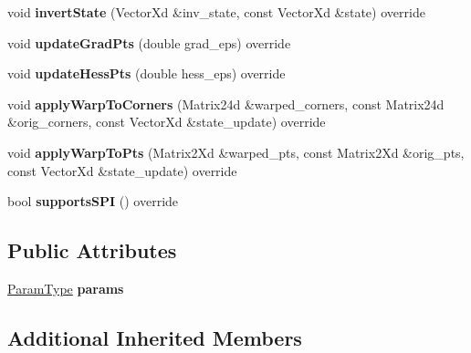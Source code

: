 \begin{DoxyCompactItemize}
\item 
\hypertarget{classIsometry_a7658e88cc1e74e64661b4db66d07be65}{void {\bfseries invert\-State} (Vector\-Xd \&inv\-\_\-state, const Vector\-Xd \&state) override}\label{classIsometry_a7658e88cc1e74e64661b4db66d07be65}

\item 
\hypertarget{classIsometry_af95c9c6d8ff1f16dad79428f77138753}{void {\bfseries update\-Grad\-Pts} (double grad\-\_\-eps) override}\label{classIsometry_af95c9c6d8ff1f16dad79428f77138753}

\item 
\hypertarget{classIsometry_a7dfb58a9b488913e6c4fd58c9b3803e2}{void {\bfseries update\-Hess\-Pts} (double hess\-\_\-eps) override}\label{classIsometry_a7dfb58a9b488913e6c4fd58c9b3803e2}

\item 
\hypertarget{classIsometry_afd4ab065934a567de9dc58be8e247c42}{void {\bfseries apply\-Warp\-To\-Corners} (Matrix24d \&warped\-\_\-corners, const Matrix24d \&orig\-\_\-corners, const Vector\-Xd \&state\-\_\-update) override}\label{classIsometry_afd4ab065934a567de9dc58be8e247c42}

\item 
\hypertarget{classIsometry_a891953387d71ddd0610d23fa34910058}{void {\bfseries apply\-Warp\-To\-Pts} (Matrix2\-Xd \&warped\-\_\-pts, const Matrix2\-Xd \&orig\-\_\-pts, const Vector\-Xd \&state\-\_\-update) override}\label{classIsometry_a891953387d71ddd0610d23fa34910058}

\item 
\hypertarget{classIsometry_a2bbfe5b1cf276d452041d7d97d6c8385}{bool {\bfseries supports\-S\-P\-I} () override}\label{classIsometry_a2bbfe5b1cf276d452041d7d97d6c8385}

\end{DoxyCompactItemize}
\subsection*{Public Attributes}
\begin{DoxyCompactItemize}
\item 
\hypertarget{classIsometry_a22942287eb439a9f070591f0b0f6494c}{\hyperlink{structIsometryParams}{Param\-Type} {\bfseries params}}\label{classIsometry_a22942287eb439a9f070591f0b0f6494c}

\end{DoxyCompactItemize}
\subsection*{Additional Inherited Members}


